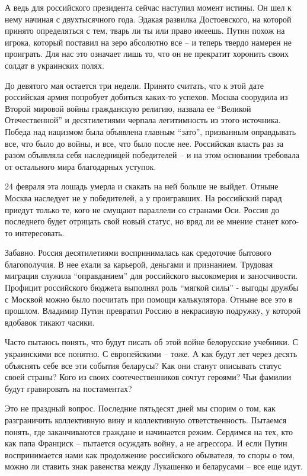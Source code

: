 А ведь для российского президента сейчас наступил момент истины. Он шел к нему
начиная с двухтысячного года. Эдакая развилка Достоевского, на которой принято
определяться с тем, тварь ли ты или право имеешь. Путин похож на игрока,
который поставил на зеро абсолютно все – и теперь твердо намерен не проиграть.
Для нас это означает лишь то, что он не прекратит хоронить своих солдат в
украинских полях.

До девятого мая остается три недели. Принято считать, что к этой дате
российская армия попробует добиться каких-то успехов. Москва соорудила из
Второй мировой войны гражданскую религию, назвала ее \enquote{Великой Отечественной} и
десятилетиями черпала легитимность из этого источника. Победа над нацизмом была
объявлена главным \enquote{зато}, призванным оправдывать все, что было до войны, и все,
что было после нее. Российская власть раз за разом объявляла себя наследницей
победителей – и на этом основании требовала от остального мира благодарных
уступок.

24 февраля эта лошадь умерла и скакать на ней больше не выйдет. Отныне Москва
наследует не у победителей, а у проигравших. На российский парад приедут только
те, кого не смущают параллели со странами Оси. Россия до последнего будет
отрицать свой новый статус, но вряд ли ее мнение станет кого-то интересовать.  

Забавно. Россия десятилетиями воспринималась как средоточие бытового
благополучия. В нее ехали за карьерой, деньгами и признанием. Трудовая миграция
служила \enquote{оправданием} для российского высокомерия и заносчивости. Профицит
российского бюджета выполнял роль \enquote{мягкой силы} - выгоды дружбы с Москвой можно
было посчитать при помощи калькулятора. Отныне все это в прошлом. Владимир
Путин превратил Россию в некрасивую подружку, у которой вдобавок тикают часики.

Часто пытаюсь понять, что будут писать об этой войне белорусские учебники. С
украинскими все понятно. С европейскими – тоже. А как будут лет через десять
объяснять себе все эти события беларусы? Как они станут описывать статус своей
страны? Кого из своих соотечественников сочтут героями? Чьи фамилии будут
гравировать на постаментах?

Это не праздный вопрос. Последние пятьдесят дней мы спорим о том, как
разграничить коллективную вину и коллективную ответственность. Пытаемся понять,
где заканчиваются граждане и начинается режим. Сердимся на тех, кто как папа
Франциск – пытается осуждать войну, а не агрессора. И если Путин воспринимается
нами как продолжение российского обывателя, то споры о том, можно ли ставить
знак равенства между Лукашенко и беларусами – все еще идут.

